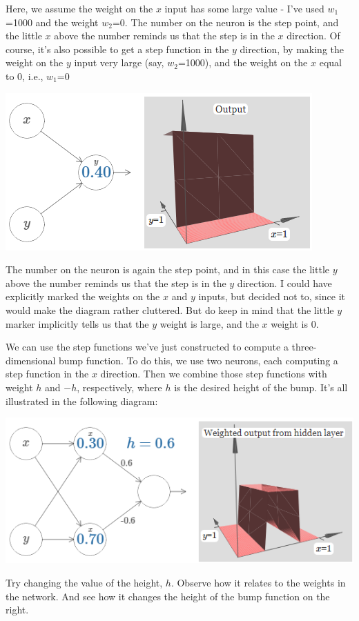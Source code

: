 Here, we assume the weight on the $x$ input has some large value - I've used $w_1$=1000 and the weight $w_2$=0. The number on the neuron is the step point, and the little $x$ above the number reminds us that the step is in the $x$ direction. Of course, it's also possible to get a step function in the $y$ direction, by making the weight on the $y$ input very large (say, $w_2$=1000), and the weight on the $x$ equal to 0, i.e., $w_1$=0

{\centering \includegraphics[width=.6\textwidth,]{pic/wigglyfn25} \par}

The number on the neuron is again the step point, and in this case the little $y$
above the number reminds us that the step is in the $y$ direction. I could have explicitly marked the weights on the $x$ and $y$ inputs, but decided not to, since it would make the diagram rather cluttered. But do keep in mind that the little $y$ marker implicitly tells us that the $y$ weight is large, and the $x$ weight is 0.

We can use the step functions we've just constructed to compute a three-dimensional bump function. To do this, we use two neurons, each computing a step function in the $x$
direction. Then we combine those step functions with weight $h$ and $-h$, respectively, where $h$ is the desired height of the bump. It's all illustrated in the following diagram:

{\centering \includegraphics[width=.7\textwidth,]{pic/wigglyfn26} \par}

Try changing the value of the height, $h$. Observe how it relates to the weights in the network. And see how it changes the height of the bump function on the right.

